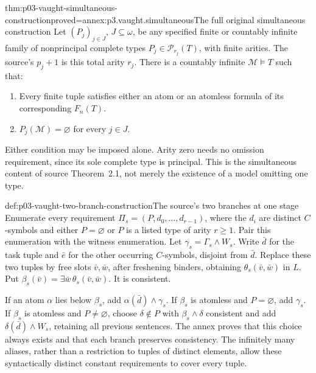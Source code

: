 \begin{hbtheorem}{thm:p03-vaught-simultaneous-construction}{proved=annex:p3.vaught.simultaneous}{The full original simultaneous construction}
Let \((P_j)_{j\in J}\), \(J\subseteq\omega\), be any specified finite
or countably infinite family of nonprincipal complete types
\(P_j\in\mathcal P_{r_j}(T)\), with finite arities.
The source's \(p_j+1\) is this total arity \(r_j\).
There is a countably infinite \(\mathcal M\models T\) such that:
\begin{enumerate}
\item Every finite tuple satisfies either an atom or an atomless formula
      of its corresponding \(F_n(T)\).
\item \(P_j(\mathcal M)=\varnothing\) for every \(j\in J\).
\end{enumerate}
Either condition may be imposed alone. Arity zero needs no omission
requirement, since its sole complete type is principal.
This is the simultaneous content of source Theorem~2.1, not merely
the existence of a model omitting one type.
\end{hbtheorem}

\begin{hbmethod}{def:p03-vaught-two-branch-construction}{The source's two branches at one stage}
Enumerate every requirement \(\Pi_s=(P,d_0,\ldots,d_{r-1})\), where the
\(d_i\) are distinct \(C\)-symbols and either \(P=\varnothing\) or
\(P\) is a listed type of arity \(r\geq1\).
Pair this enumeration with the witness enumeration.
Let \(\gamma_s=\Gamma_s\land W_s\).
Write \(\bar d\) for the task tuple and \(\bar e\) for the other
occurring \(C\)-symbols, disjoint from \(\bar d\).
Replace these two tuples by free slots \(\bar v,\bar w\), after
freshening binders, obtaining \(\theta_s(\bar v,\bar w)\) in \(L\).
Put \(\beta_s(\bar v)=\exists\bar w\,\theta_s(\bar v,\bar w)\).
It is consistent.

If an atom \(\alpha\) lies below \(\beta_s\), add
\(\alpha(\bar d)\land\gamma_s\).
If \(\beta_s\) is atomless and \(P=\varnothing\), add \(\gamma_s\).
If \(\beta_s\) is atomless and \(P\ne\varnothing\), choose
\(\delta\notin P\) with \(\beta_s\land\delta\) consistent and add
\(\delta(\bar d)\land W_s\), retaining all previous sentences.
The annex proves that this choice always exists and that each branch
preserves consistency. The infinitely many aliases, rather than a
restriction to tuples of distinct elements, allow these syntactically
distinct constant requirements to cover every tuple.
\end{hbmethod}

